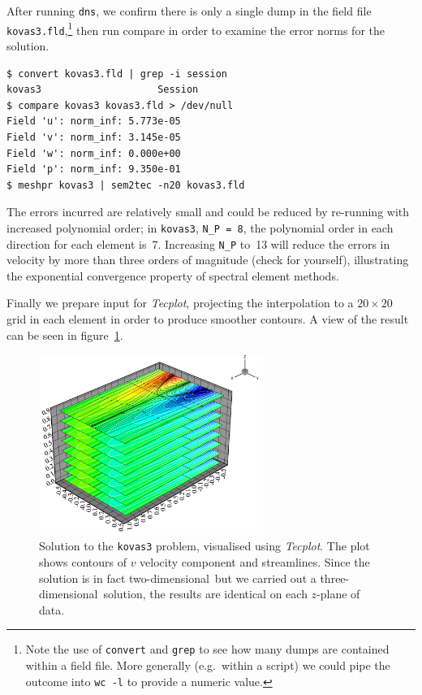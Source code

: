 \documentclass[11pt]{report}
\newcommand{\Tecplot}{\emph{Tecplot}}
\newcommand\twod{two-di\-men\-sion\-al}
\newcommand\threed{three-di\-men\-sion\-al}
\newcommand{\eg}{e.g.\ } \newcommand{\CC}{\mathrm{c.c.}}
\begin{document}
After running \verb+dns+, we confirm there is only a single dump in
the field file \verb+kovas3.fld+,\footnote{Note the use of
  \texttt{convert} and \texttt{grep} to see how many dumps are
  contained within a field file.  More generally (\eg within a script)
  we could pipe the outcome into \texttt{wc -l} to provide a numeric
  value.}  then run compare in order to examine the error norms for
the solution.
%
{\small
\begin{verbatim}
$ convert kovas3.fld | grep -i session
kovas3                    Session
$ compare kovas3 kovas3.fld > /dev/null
Field 'u': norm_inf: 5.773e-05
Field 'v': norm_inf: 3.145e-05
Field 'w': norm_inf: 0.000e+00
Field 'p': norm_inf: 9.350e-01
$ meshpr kovas3 | sem2tec -n20 kovas3.fld
\end{verbatim}
}
%
The errors incurred are relatively small and could be reduced by
re-running with increased polynomial order; in \verb|kovas3|,
\verb|N_P = 8|, \ie the polynomial order in each direction for each
element is~7.  Increasing \verb|N_P| to~13 will reduce the errors in
velocity by more than three orders of magnitude (check for yourself),
illustrating the exponential convergence property of spectral element
methods.

Finally we prepare input for \Tecplot, projecting the
interpolation to a $20\times20$ grid in each element in order to
produce smoother contours.  A view of the result can be seen in
figure~\ref{kov3soln}.
\begin{figure}
\begin{center}
\includegraphics[width=0.65\textwidth]{kovas3_bitmap}
\end{center}
\caption{
\label{kov3soln}
  Solution to the \texttt{kovas3} problem, visualised using \Tecplot.
  The plot shows contours of $v$ velocity component and streamlines.
  Since the solution is in fact \twod\ but we carried out a
  \threed\ solution, the results are identical on each $z$-plane of
  data. }
\end{figure}
\end{document}
